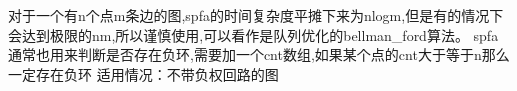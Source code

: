 对于一个有n个点m条边的图,spfa的时间复杂度平摊下来为nlogm,但是有的情况下会达到极限的nm,所以谨慎使用,可以看作是队列优化的bellman_ford算法。
spfa通常也用来判断是否存在负环,需要加一个cnt数组,如果某个点的cnt大于等于n那么一定存在负环
适用情况：不带负权回路的图